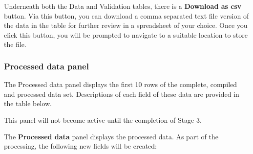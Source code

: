 \documentclass[
  8pt,
  a4paper]{article}
\begin{document}
Underneath both the Data and Validation tables, there is a
\textbf{Download as csv} button. Via this button, you can download a
comma separated text file version of the data in the table for further
review in a spreadsheet of your choice. Once you click this button, you
will be prompted to navigate to a suitable location to store the file.

\subsubsection{Processed data panel}\label{processed-data-panel}

The Processed data panel displays the first 10 rows of the complete,
compiled and processed data set. Descriptions of each field of these
data are provided in the table below.

\begin{tcolorbox}[enhanced jigsaw, breakable, rightrule=.15mm, toprule=.15mm, colbacktitle=quarto-callout-note-color!10!white, colframe=quarto-callout-note-color-frame, coltitle=black, bottomrule=.15mm, colback=white, opacityback=0, bottomtitle=1mm, left=2mm, title=\textcolor{quarto-callout-note-color}{\faInfo}\hspace{0.5em}{Note}, toptitle=1mm, titlerule=0mm, arc=.35mm, opacitybacktitle=0.6, leftrule=.75mm]

This panel will not become active until the completion of Stage 3.

\end{tcolorbox}

The \textbf{Processed data} panel displays the processed data. As part
of the processing, the following new fields will be created:
\end{document}
